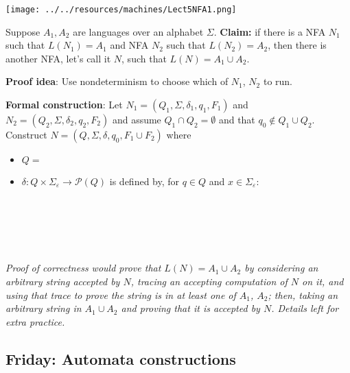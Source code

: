\documentclass[12pt, oneside]{article}
\begin{document}
\vspace{-30pt}

\texttt{[image: ../../resources/machines/Lect5NFA1.png]}


Suppose $A_1, A_2$ are languages over an alphabet $\Sigma$.
{\bf Claim:} if there is a NFA $N_1$ such that $L(N_1) = A_1$ and 
NFA $N_2$ such that $L(N_2) = A_2$, then there is another NFA, let's call it $N$, such that 
$L(N) = A_1 \cup A_2$.

{\bf Proof idea}: Use nondeterminism to choose which of $N_1$, $N_2$ to run.

\vfill
\begin{comment}
    Draw schematic
\end{comment}

{\bf Formal construction}: Let 
$N_1 = (Q_1, \Sigma, \delta_1, q_1, F_1)$ and $N_2 = (Q_2, \Sigma, \delta_2,q_2, F_2)$
and assume $Q_1 \cap Q_2 = \emptyset$ and that $q_0 \notin Q_1 \cup Q_2$.
Construct $N = (Q, \Sigma, \delta, q_0, F_1 \cup F_2)$ where
\begin{itemize}
    \item $Q = $
    \item $\delta: Q \times \Sigma_\varepsilon \to \mathcal{P}(Q)$ is defined by, for $q \in Q$ and $x \in \Sigma_{\varepsilon}$:
        \[
            \phantom{\delta((q,x))=\begin{cases}  \delta_1 ((q,x)) &\qquad\text{if } q\in Q_1 \\ \delta_2 ((q,x)) &\qquad\text{if } q\in Q_2 \\ \{q1,q2\} &\qquad\text{if } q = q_0, x = \varepsilon \\ \emptyset\text{if } q= q_0, x \neq \varepsilon \end{cases}}
        \]
\end{itemize}


\vfill
{\it Proof of correctness would prove that $L(N) = A_1 \cup A_2$ by considering
an arbitrary string accepted by $N$, tracing an accepting computation of $N$ on it, and using 
that trace to prove the string is in at least one of $A_1$, $A_2$; then, taking an arbitrary 
string in $A_1 \cup A_2$ and proving that it is accepted by $N$. Details left for extra practice.}
 
\newpage
\subsection*{Friday: Automata constructions}
\end{document}
